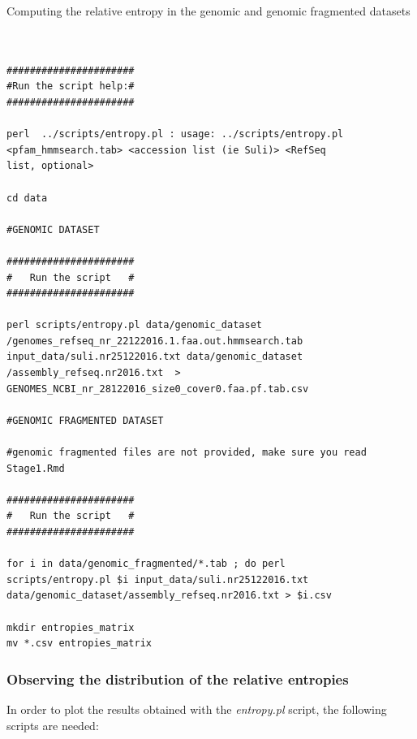 \documentclass[12pt]{report}
\begin{document}
Computing the relative entropy in the genomic and genomic fragmented datasets 

\begin{verbatim}


######################
#Run the script help:#
######################

perl  ../scripts/entropy.pl : usage: ../scripts/entropy.pl 
<pfam_hmmsearch.tab> <accession list (ie Suli)> <RefSeq 
list, optional>

cd data

#GENOMIC DATASET

######################
#   Run the script   #
######################

perl scripts/entropy.pl data/genomic_dataset
/genomes_refseq_nr_22122016.1.faa.out.hmmsearch.tab 
input_data/suli.nr25122016.txt data/genomic_dataset
/assembly_refseq.nr2016.txt  > 
GENOMES_NCBI_nr_28122016_size0_cover0.faa.pf.tab.csv

#GENOMIC FRAGMENTED DATASET  

#genomic fragmented files are not provided, make sure you read 
Stage1.Rmd 

######################
#   Run the script   #
######################

for i in data/genomic_fragmented/*.tab ; do perl 
scripts/entropy.pl $i input_data/suli.nr25122016.txt 
data/genomic_dataset/assembly_refseq.nr2016.txt > $i.csv 

mkdir entropies_matrix
mv *.csv entropies_matrix

\end{verbatim}

\subsubsection{Observing the distribution of the relative entropies}


In order to plot the results obtained with the \textit{entropy.pl} script, the
following scripts are needed:   
\end{document}
